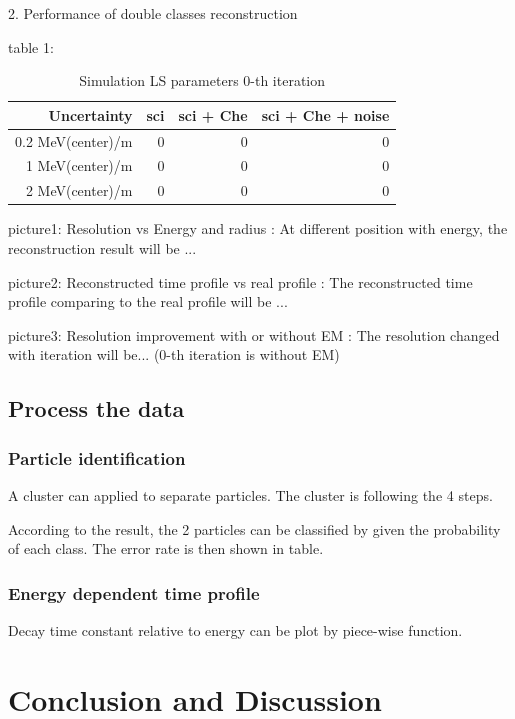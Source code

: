\documentclass{article}
\begin{document}
\par 2. Performance of double classes reconstruction
\par table 1:
	\begin{table}[htbp]
		\centering
		\caption{Simulation LS parameters 0-th iteration}
		\label{tab:4}	
		\begin{tabular}{|r|*{3}{r|}}
		\hline
		Uncertainty & sci & sci + Che & sci + Che + noise\\
		\hline
		0.2 MeV(center)/m & 0 & 0 & 0 \\
		1 MeV(center)/m & 0 & 0 & 0 \\
		2 MeV(center)/m & 0 & 0 & 0 \\
		\hline
		\end{tabular}
	\end{table}
	
\par picture1: Resolution vs Energy and radius : At different position with energy, the reconstruction result will be ...
\par picture2: Reconstructed time profile vs real profile : The reconstructed time profile comparing to the real profile will be ...
\par picture3: Resolution improvement with or without EM : The resolution changed with iteration will be... (0-th iteration is without EM)
\subsection{Process the data} 
\subsubsection{Particle identification}
\par A cluster can applied to separate particles. The cluster is following the 4 steps.
\par According to the result, the 2 particles can be classified by given the probability of each class. The error rate is then shown in table.
\subsubsection{Energy dependent time profile}
\par Decay time constant relative to energy can be plot by piece-wise function.

\section{Conclusion and Discussion}
\end{document}
